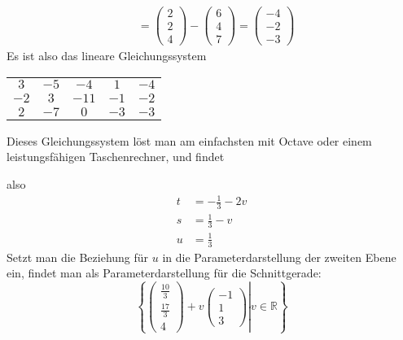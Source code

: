 \begin{loesung}
\begin{align*}
&=
\begin{pmatrix}2\\2\\4\end{pmatrix}
-
\begin{pmatrix}6\\4\\7\end{pmatrix}
=
\begin{pmatrix}-4\\-2\\-3\end{pmatrix}
\end{align*}
Es ist also das lineare Gleichungssystem
\begin{center}
\begin{tabular}{|cccc|c|}
\hline
$ 3$&$-5$&$ -4$&$ 1$&$-4$\\
$-2$&$ 3$&$-11$&$-1$&$-2$\\
$ 2$&$-7$&$  0$&$-3$&$-3$\\
\hline
\end{tabular}
\end{center}
Dieses Gleichungssystem löst man am einfachsten mit Octave oder
einem leistungsfähigen Taschenrechner, und findet

also
\begin{align*}
t&=-\frac13-2v\\
s&=\frac13-v\\
u&=\frac13
\end{align*}
Setzt man die Beziehung für $u$ in die Parameterdarstellung der
zweiten Ebene  ein, findet man als Parameterdarstellung für die
Schnittgerade:
\[
\left\{\left.
\begin{pmatrix}\frac{10}{3}\\\frac{17}{3}\\4\end{pmatrix}
+v
\begin{pmatrix}-1\\1\\3\end{pmatrix}
\right|
v\in\mathbb R
\right\}
\]

\end{loesung}

